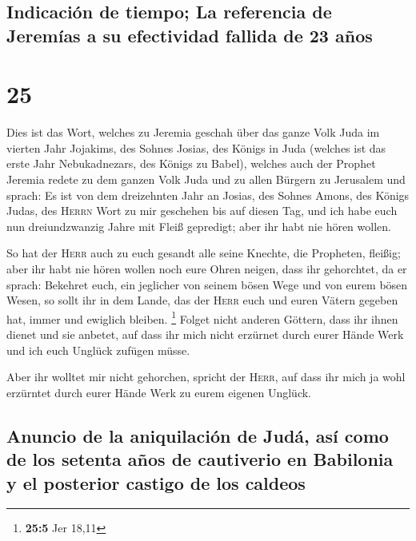 \hypertarget{indicaciuxf3n-de-tiempo-la-referencia-de-jeremuxedas-a-su-efectividad-fallida-de-23-auxf1os}{%
\subsection{Indicación de tiempo; La referencia de Jeremías a su
efectividad fallida de 23
años}\label{indicaciuxf3n-de-tiempo-la-referencia-de-jeremuxedas-a-su-efectividad-fallida-de-23-auxf1os}}

\hypertarget{section-24}{%
\section{25}\label{section-24}}

 Dies ist das Wort, welches zu Jeremia geschah über das
ganze Volk Juda im vierten Jahr Jojakims, des Sohnes Josias, des Königs
in Juda (welches ist das erste Jahr Nebukadnezars, des Königs zu Babel),
 welches auch der Prophet Jeremia redete zu dem ganzen
Volk Juda und zu allen Bürgern zu Jerusalem und sprach: 
Es ist von dem dreizehnten Jahr an Josias, des Sohnes Amons, des Königs
Judas, des \textsc{Herrn} Wort zu mir geschehen bis auf diesen Tag, und
ich habe euch nun dreiundzwanzig Jahre mit Fleiß gepredigt; aber ihr
habt nie hören wollen.

 So hat der \textsc{Herr} auch zu euch gesandt alle seine
Knechte, die Propheten, fleißig; aber ihr habt nie hören wollen noch
eure Ohren neigen, dass ihr gehorchtet,  da er sprach:
Bekehret euch, ein jeglicher von seinem bösen Wege und von eurem bösen
Wesen, so sollt ihr in dem Lande, das der \textsc{Herr} euch und euren
Vätern gegeben hat, immer und ewiglich bleiben. \footnote{\textbf{25:5}
  Jer 18,11}  Folget nicht anderen Göttern, dass ihr ihnen
dienet und sie anbetet, auf dass ihr mich nicht erzürnet durch eurer
Hände Werk und ich euch Unglück zufügen müsse.

 Aber ihr wolltet mir nicht gehorchen, spricht der
\textsc{Herr}, auf dass ihr mich ja wohl erzürntet durch eurer Hände
Werk zu eurem eigenen Unglück.

\hypertarget{anuncio-de-la-aniquilaciuxf3n-de-juduxe1-asuxed-como-de-los-setenta-auxf1os-de-cautiverio-en-babilonia-y-el-posterior-castigo-de-los-caldeos}{%
\subsection{Anuncio de la aniquilación de Judá, así como de los setenta
años de cautiverio en Babilonia y el posterior castigo de los
caldeos}\label{anuncio-de-la-aniquilaciuxf3n-de-juduxe1-asuxed-como-de-los-setenta-auxf1os-de-cautiverio-en-babilonia-y-el-posterior-castigo-de-los-caldeos}}

